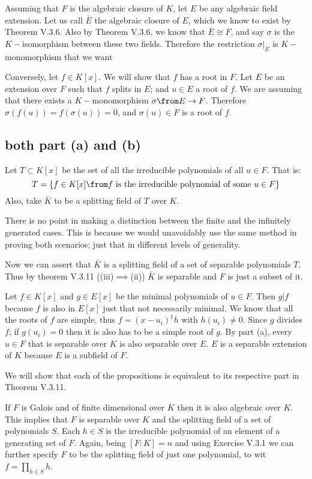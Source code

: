 Assuming that $F$ is the algebraic closure of $K$, let $E$ be any algebraic field extension.
Let us call $\bar E$ the algebraic closure of $E$, which we know to exist by Theorem V.3.6.
Also by  Theorem V.3.6, we know that $\bar E \cong F$, and say $\sigma$ is the $K-$isomorphism between these two fields.
Therefore the restriction $\sigma|_E$ is $K-$monomorphism that we want

Conversely, let $f\in K[x]$. We will show that $f$ has a root in $F$.
Let $E$ be an extension over $F$ such that $f$ splits in $E$; and $u\in E$ a root of $f$.
We are assuming that there exists a $K-$monomorphism $\sigma\from E\to F$.
Therefore $\sigma(f(u))=f(\sigma(u))=0$, and $\sigma(u)\in F$ is a root of $f$. 

\subsection*{both part (a) and (b)}
Let $T\subset K[x]$ be the set of all the irreducible polynomials of all $u\in F$. That is:
$$T=\{ f\in K[x] \from f \text{ is the irreducible polynomial of some } u\in F\}$$
Also, take $\bar K$ to be a splitting field of $T$ over $K$. 

There is no point in making a distinction between the finite and the infinitely generated cases. This is because we would unavoidably use the same method in proving both scenarios; just that in different levels of generality.

Now we can assert that $\bar K$ is a splitting field of a set of separable polynomials $T$.
Thus by theorem V.3.11 ((iii)$\implies $(ii)) $\bar K$ is separable and $F$ is just a subset of it.

Let $f\in K[x]$ and $g\in E[x]$ be the minimal polynomials of $u\in F$. Then $g|f$ because $f$ is also in $E[x]$ just that not necessarily minimal. We know that all the roots of $f$ are simple, thus $f= (x-u_i)^1h$ with $h(u_i)\neq 0$. Since $g$ divides $f$; if $g(u_i)=0$ then it is also has to be a simple root of $g$.
By part (a), every $u\in F$ that is separable over $K$ is also separable over $E$. 
$E$ is a separable extension of $K$ because $E$ is a subfield of $F$.

We will show that each of the propositions is equivalent to its respective part in  Theorem V.3.11.

If $F$ is Galois and of finite dimensional over $K$ then it is also algebraic over $K$. 
This implies that $F$ is separable over $K$ and  the splitting field of a  set of polynomials $S$. 
Each $h\in S$ is the irreducible polynomial of an element of a generating set of $F$. 
Again, being $[F:K]=n$ and using Exercise V.3.1 we can further specify $F$ to be the splitting field of just one polynomial, to wit $f=\prod_{h\in S}h$.

